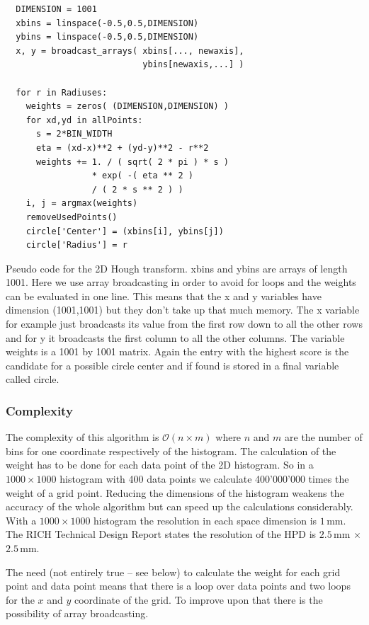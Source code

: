\documentclass[11pt,twoside]{scrreprt}
\begin{document}
\begin{codesnippet}[htb]
\begin{lstlisting}
  DIMENSION = 1001
  xbins = linspace(-0.5,0.5,DIMENSION)
  ybins = linspace(-0.5,0.5,DIMENSION)
  x, y = broadcast_arrays( xbins[..., newaxis], 
                           ybins[newaxis,...] )

  for r in Radiuses:
    weights = zeros( (DIMENSION,DIMENSION) )
    for xd,yd in allPoints:
      s = 2*BIN_WIDTH
      eta = (xd-x)**2 + (yd-y)**2 - r**2      
      weights += 1. / ( sqrt( 2 * pi ) * s ) 
                 * exp( -( eta ** 2 ) 
                 / ( 2 * s ** 2 ) )
    i, j = argmax(weights)
    removeUsedPoints()
    circle['Center'] = (xbins[i], ybins[j])
    circle['Radius'] = r
\end{lstlisting}
  \caption[Pseudo code 2D HT]{Pseudo code for the 2D Hough transform. xbins and ybins are arrays of length 1001. Here we use array 
  broadcasting in order to avoid for loops and the weights can be evaluated in one line. This means that the x and y variables have 
  dimension (1001,1001) but they don't take up that much memory. The x variable for example just broadcasts its value from the first 
  row down to all the other rows and for y it broadcasts the first column to all the other columns. The variable weights is a 1001 by 
  1001 matrix. Again the entry with the highest score is the candidate for a possible circle center and if found is stored in a final 
  variable called circle.}
\end{codesnippet}


\subsubsection{Complexity} %
\label{ssub:complexity_2d}
The complexity of this algorithm is $\mathcal{O}(n\times m)$ where $n$ and $m$ are the number of bins for one coordinate respectively of 
the histogram. The calculation of the weight has to be done for each data point of the 2D histogram. So in a $1000\times 1000$ histogram 
with 400 data points we calculate 400'000'000 times the weight of a grid point. Reducing the dimensions of the histogram weakens the 
accuracy of the whole algorithm but can speed up the calculations considerably. With a $1000\times 1000$ histogram the resolution in each 
space dimension is $1$\,mm. The RICH Technical Design Report states the resolution of the HPD is $2.5$\,mm $\times$ $2.5$\,mm.

The need (not entirely true -- see below) to calculate the weight for each grid point and data point means that there is a loop over 
data points and two loops for the $x$ and $y$ coordinate of the grid. To improve upon that there is the possibility of array broadcasting.
\end{document}
